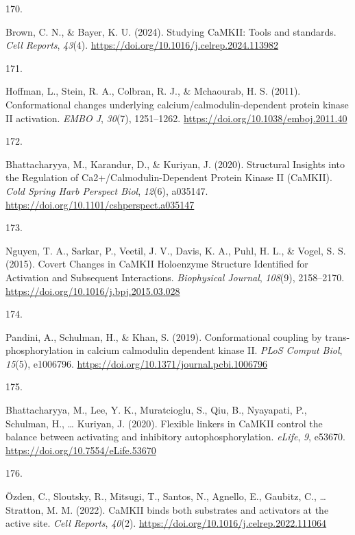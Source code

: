 \documentclass[
  11pt,
  letterpaper,
]{scrreprt}
\newlength{\cslhangindent}
\newlength{\csllabelwidth}
\newenvironment{CSLReferences}[2] %
 {\begin{list}{}{%
  \setlength{\itemindent}{0pt}
  \setlength{\leftmargin}{0pt}
  \setlength{\parsep}{0pt}
  \ifodd #1
   \setlength{\leftmargin}{\cslhangindent}
   \setlength{\itemindent}{-1\cslhangindent}
  \fi
  \setlength{\itemsep}{#2\baselineskip}}}
 {\end{list}}
\newcommand{\CSLLeftMargin}[1]{\parbox[t]{\csllabelwidth}{\strut#1\strut}}
\newcommand{\CSLRightInline}[1]{\parbox[t]{\linewidth - \csllabelwidth}{\strut#1\strut}}
\begin{document}
\begin{CSLReferences}{0}{0}
\CSLLeftMargin{170. }%
\CSLRightInline{Brown, C. N., \& Bayer, K. U. (2024). Studying {CaMKII}:
{Tools} and standards. \emph{Cell Reports}, \emph{43}(4).
\url{https://doi.org/10.1016/j.celrep.2024.113982}}

\CSLLeftMargin{171. }%
\CSLRightInline{Hoffman, L., Stein, R. A., Colbran, R. J., \& Mchaourab,
H. S. (2011). Conformational changes underlying
calcium/calmodulin-dependent protein kinase {II} activation. \emph{EMBO
J}, \emph{30}(7), 1251--1262.
\url{https://doi.org/10.1038/emboj.2011.40}}

\CSLLeftMargin{172. }%
\CSLRightInline{Bhattacharyya, M., Karandur, D., \& Kuriyan, J. (2020).
Structural {Insights} into the {Regulation} of
{Ca2}+/{Calmodulin-Dependent Protein Kinase II} ({CaMKII}). \emph{Cold
Spring Harb Perspect Biol}, \emph{12}(6), a035147.
\url{https://doi.org/10.1101/cshperspect.a035147}}

\CSLLeftMargin{173. }%
\CSLRightInline{Nguyen, T. A., Sarkar, P., Veetil, J. V., Davis, K. A.,
Puhl, H. L., \& Vogel, S. S. (2015). Covert {Changes} in {CaMKII
Holoenzyme Structure Identified} for {Activation} and {Subsequent
Interactions}. \emph{Biophysical Journal}, \emph{108}(9), 2158--2170.
\url{https://doi.org/10.1016/j.bpj.2015.03.028}}

\CSLLeftMargin{174. }%
\CSLRightInline{Pandini, A., Schulman, H., \& Khan, S. (2019).
Conformational coupling by trans-phosphorylation in calcium calmodulin
dependent kinase {II}. \emph{PLoS Comput Biol}, \emph{15}(5), e1006796.
\url{https://doi.org/10.1371/journal.pcbi.1006796}}

\CSLLeftMargin{175. }%
\CSLRightInline{Bhattacharyya, M., Lee, Y. K., Muratcioglu, S., Qiu, B.,
Nyayapati, P., Schulman, H., \ldots{} Kuriyan, J. (2020). Flexible
linkers in {CaMKII} control the balance between activating and
inhibitory autophosphorylation. \emph{eLife}, \emph{9}, e53670.
\url{https://doi.org/10.7554/eLife.53670}}

\CSLLeftMargin{176. }%
\CSLRightInline{Özden, C., Sloutsky, R., Mitsugi, T., Santos, N.,
Agnello, E., Gaubitz, C., \ldots{} Stratton, M. M. (2022). {CaMKII}
binds both substrates and activators at the active site. \emph{Cell
Reports}, \emph{40}(2).
\url{https://doi.org/10.1016/j.celrep.2022.111064}}


\end{CSLReferences}
\end{document}
